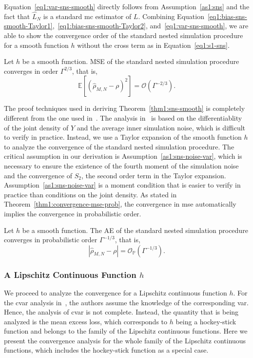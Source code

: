 Equation~\eqref{eq1:var-sns-smooth} directly follows from Assumption~\ref{as1:sns} and the fact that $\hat{L}_N$ is a standard \gls{mc} estimator of $L$.
Combining Equation~\eqref{eq1:bias-sns-smooth-Taylor1},~\ref{eq1:bias-sns-smooth-Taylor2}, and~\ref{eq1:var-sns-smooth}, we are able to show the convergence order of the standard nested simulation procedure for a smooth function $h$ without the cross term as in Equation~\eqref{eq1:s1-sns}.

\begin{theorem}\label{thm1:sns-smooth}
    Let $h$ be a smooth function. 
    MSE of the standard nested simulation procedure converges in order $\Gamma^{2/3}$, that is,
    $$\mathbb{E} \left[ \left( \hat{\rho}_{M, N} - \rho \right)^2 \right] = \mathcal{O}(\Gamma^{-2/3}).$$
\end{theorem}

The proof techniques used in deriving Theorem~\ref{thm1:sns-smooth} is completely different from the one used in~\cite{gordy2010nested}.
The analysis in~\cite{gordy2010nested} is based on the differentiablity of the joint density of $Y$ and the average inner simulation noise, which is difficult to verify in practice.
Instead, we use a Taylor expansion of the smooth function $h$ to analyze the convergence of the standard nested simulation procedure.
The critical assumption in our derivation is Assumption~\ref{as1:sns-noise-var}, which is necessary to ensure the existence of the fourth moment of the simulation noise and the convergence of $S_2$, the second order term in the Taylor expansion.
Assumption~\ref{as1:sns-noise-var} is a moment condition that is easier to verify in practice than conditions on the joint density.
As stated in Theorem~\ref{thm1:convergence-mse-prob}, the convergence in \gls{mse} automatically implies the convergence in probabilistic order.

\begin{corollary}
    Let $h$ be a smooth function. 
    The AE of the standard nested simulation procedure converges in probabilistic order $\Gamma^{-1/3}$, that is,
    $$\left| \hat{\rho}_{M, N} - \rho \right| = \mathcal{O}_\mathbb{P}(\Gamma^{-1/3}).$$
\end{corollary}

\subsubsection*{A Lipschitz Continuous Function $h$}
We proceed to analyze the convergence for a Lipschitz continuous function $h$.
For the \gls{cvar} analysis in~\cite{gordy2010nested}, the authors assume the knowledge of the corresponding \gls{var}.
Hence, the analysis of \gls{cvar} is not complete.
Instead, the quantity that is being analyzed is the mean excess loss, which corresponds to $h$ being a hockey-stick function and belongs to the family of the Lipschitz continuous functions. 
Here we present the convergence analysis for the whole family of the Lipschitz continuous functions, which includes the hockey-stick function as a special case. 

